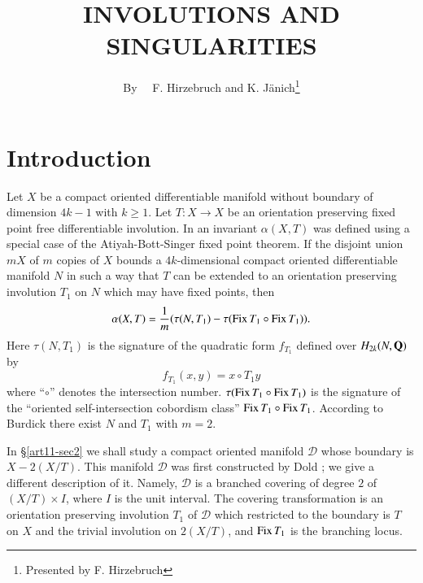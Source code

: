 \title{INVOLUTIONS AND SINGULARITIES}

\author{By~~ F. Hirzebruch and K. J\"anich\footnote{Presented by F. Hirzebruch}}

\date{}

\maketitle

\setcounter{pageoriginal}{218}
\section{Introduction}\label{art10-sec1}\pageoriginale

Let $X$ be a compact oriented differentiable manifold without boundary of dimension $4k-1$ with $k\geq 1$. Let $T:X\to X$ be an orientation preserving fixed point free differentiable involution. In \cite{art11-key7} an invariant $\alpha(X,T)$ was defined using a special case of the Atiyah-Bott-Singer fixed point theorem. If the disjoint union $mX$ of $m$ copies of $X$ bounds a $4k$-dimensional compact oriented differentiable manifold $N$ in such a way that $T$ can be extended to an orientation preserving involution $T_{1}$ on $N$ which may have fixed points, then
\begin{equation}
\alpha(X,T)=\dfrac{1}{m}(\tau(N,T_{1})- \tau(\operatorname{\mathrm{Fix}} T_{1}\circ \operatorname{\mathrm{Fix}} T_{1})).\label{art11-sec1-eq1}
\end{equation}
Here $\tau(N,T_{1})$ is the signature of the quadratic form $f_{T_{1}}$ defined over $H_{2k}(N,\mathbf{Q})$ by
$$
f_{T_{1}}(x,y)=x\circ T_{1}y
$$
where ``$\circ$'' denotes the intersection number. $\tau(\operatorname{\mathrm{Fix}} T_{1}\circ \operatorname{\mathrm{Fix}} T_{1})$ is the signature of the ``oriented self-intersection cobordism class'' $\operatorname{\mathrm{Fix}} T_{1}\circ \operatorname{\mathrm{Fix}} T_{1}$. According to Burdick \cite{art11-key4} there exist $N$ and $T_{1}$ with $m=2$.

In \S\ref{art11-sec2} we shall study a compact oriented manifold $\mathscr{D}$ whose boundary is $X-2(X/T)$. This manifold $\mathscr{D}$ was first constructed by Dold \cite{art11-key5}; we give a different description of it. Namely, $\mathscr{D}$ is a branched covering of degree $2$ of $(X/T)\times I$, where $I$ is the unit interval. The covering transformation is an orientation preserving involution $T_{1}$ of $\mathscr{D}$ which restricted to the boundary is $T$ on $X$ and the trivial involution on $2(X/T)$, and $\operatorname{\mathrm{Fix}} T_{1}$ is the branching locus.

